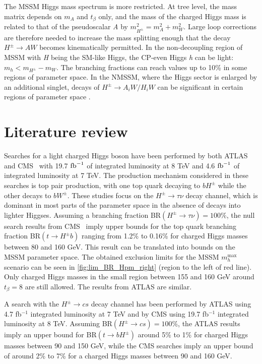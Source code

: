 The MSSM Higgs mass spectrum is more restricted. At tree level, the mass matrix depends on $m_A$ and $t_{\beta}$ only, and the mass of the charged Higgs mass is related to that of the pseudoscalar \emph{A} by $m_{H^{\pm}}^2 =m_A^2 + m_W^2$. Large loop corrections are therefore needed to increase the mass splitting enough that the decay $H^{\pm} \rightarrow AW$ becomes kinematically permitted. In the non-decoupling region of MSSM with \emph{H} being the SM-like Higgs, the CP-even Higgs \emph{h} can be light: $m_{h}<m_{H^{\pm}}-m_W$. The branching fractions can reach values up to 10\% \cite{Heinemeyer:2013tqa} in some regions of parameter space. In the NMSSM, where the Higgs sector is enlarged by an additional singlet, decays of $H^{\pm} \rightarrow A_iW/H_iW$ can be significant in certain regions of parameter space \cite{Christensen:2013dra,Drees:1999sb}.

\section{Literature review}\label{sec:limits}

Searches for a light charged Higgs boson have been performed by both ATLAS and CMS~\cite{TheATLAScollaboration:2013wia,CMS:2014cdp} with 19.7 $ \text{fb}^{-1} $ of integrated luminosity at 8 TeV and 4.6 $ \text{fb}^{-1} $ of integrated luminosity at 7 TeV. The production mechanism considered in these searches is top pair production, with one top quark decaying to $bH^{\pm} $ while the other decays to $bW^\pm$. These studies focus on the $H^{\pm} \rightarrow \tau \nu$ decay channel, which is dominant in most parts of the parameter space in the absence of decays into lighter Higgses. Assuming a branching fraction BR$(H^{\pm} \rightarrow \tau \nu) = 100 \%$, the null search results from CMS~\cite{CMS:2014cdp} imply upper bounds for the top quark branching fraction BR$(t \rightarrow H^{\pm} b)$ ranging from 1.2\% to 0.16\% for charged Higgs masses between 80 and 160 GeV. This result can be translated into bounds on the MSSM parameter space. The obtained exclusion limits for the MSSM $m_h^\text{max}$ scenario can be seen in \autoref{fig:lim_BR_Hpm_right} (region to the left of red line). Only charged Higgs masses in the small region between 155 and 160 GeV around $t_{\beta} = 8$ are still allowed. The results from ATLAS \cite{TheATLAScollaboration:2013wia} are similar.
 
A search with the $H^{\pm} \rightarrow cs$ decay channel has been performed by ATLAS \cite{Aad:2013hla} using 4.7 fb$^{-1}$ integrated luminosity at 7 TeV and by CMS \cite{CMS:2014kga} using 19.7 fb$^{-1}$ integrated luminosity at 8 TeV. Assuming BR$(H^{\pm} \rightarrow c s) = 100 \%$, the ATLAS results imply an upper bound for BR$(t \rightarrow b H^{\pm} )$ around 5\% to 1\% for charged Higgs masses between 90 and 150 GeV, while the CMS searches imply an upper bound of around 2\% to 7\% for a charged Higgs masses between 90 and 160 GeV.

